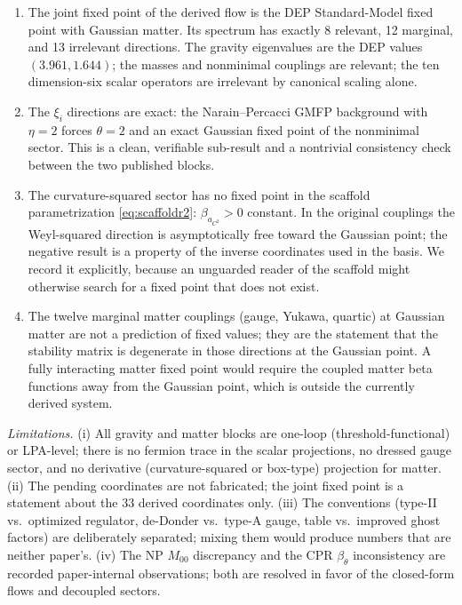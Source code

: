 \documentclass[11pt]{article}
\begin{document}
\begin{enumerate}
  \item The joint fixed point of the derived flow is the DEP
        Standard-Model fixed point with Gaussian matter.  Its spectrum has
        exactly 8 relevant, 12 marginal, and 13 irrelevant directions.  The
        gravity eigenvalues are the DEP values $(3.961,1.644)$; the masses
        and nonminimal couplings are relevant; the ten dimension-six scalar
        operators are irrelevant by canonical scaling alone.
  \item The $\xi_i$ directions are exact: the Narain--Percacci GMFP
        background with $\eta=2$ forces $\theta=2$ and an exact Gaussian
        fixed point of the nonminimal sector.  This is a clean, verifiable
        sub-result and a nontrivial consistency check between the two
        published blocks.
  \item The curvature-squared sector has no fixed point in the scaffold
        parametrization \eqref{eq:scaffoldr2}: $\beta_{a_{C^2}}>0$ constant.
        In the original couplings the Weyl-squared direction is asymptotically
        free toward the Gaussian point; the negative result is a property of
        the inverse coordinates used in the basis.  We record it explicitly,
        because an unguarded reader of the scaffold might otherwise search
        for a fixed point that does not exist.
  \item The twelve marginal matter couplings (gauge, Yukawa, quartic) at
        Gaussian matter are not a prediction of fixed values; they are the
        statement that the stability matrix is degenerate in those
        directions at the Gaussian point.  A fully interacting matter fixed
        point would require the coupled matter beta functions away from the
        Gaussian point, which is outside the currently derived system.
\end{enumerate}

\emph{Limitations.} (i) All gravity and matter blocks are one-loop
(threshold-functional) or LPA-level; there is no fermion trace in the scalar
projections, no dressed gauge sector, and no derivative (curvature-squared or
box-type) projection for matter.  (ii) The pending coordinates are not
fabricated; the joint fixed point is a statement about the 33 derived
coordinates only.  (iii) The conventions (type-II vs.\ optimized regulator,
de-Donder vs.\ type-A gauge, table vs.\ improved ghost factors) are
deliberately separated; mixing them would produce numbers that are neither
paper's.  (iv) The NP $M_{00}$ discrepancy and the CPR $\beta_\theta$
inconsistency are recorded paper-internal observations; both are resolved in
favor of the closed-form flows and decoupled sectors.
\end{document}
